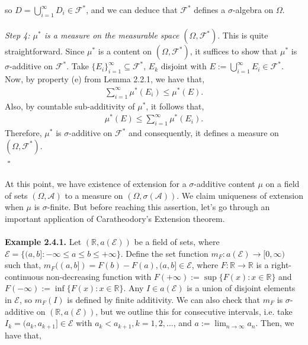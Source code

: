 \documentclass{article}
\begin{document}
so $D = \bigcup_{i=1}^{\infty}D_i \in \mathcal{F}^{*}$, and we can deduce that $\mathcal{F}^{*}$ defines a $\sigma$-algebra on $\Omega$.\\\\
\textit{Step 4: $\mu^{*}$ is a measure on the measurable space $(\Omega, \mathcal{F}^{*})$}. This is quite straightforward. Since $\mu^{*}$ is a content on $(\Omega, \mathcal{F}^{*})$, it suffices to show that $\mu^{*}$ is $\sigma$-additive on $\mathcal{F}^{*}$. Take $\{E_i\}_{i=1}^{\infty} \subseteq \mathcal{F}^{*}$, $E_k$ disjoint with $E := \bigcup_{i=1}^{\infty}E_i \in \mathcal{F}^{*}$. Now, by property (e) from Lemma 2.2.1, we have that,
\begin{eqnarray}
\nonumber
\sum_{i=1}^{\infty}\mu^{*}(E_i) \leq \mu^{*}(E).
\end{eqnarray}
Also, by countable sub-additivity of $\mu^{*}$, it follows that,
\begin{eqnarray}
\nonumber
\mu^{*}(E) \leq \sum_{i=1}^{\infty}\mu^{*}(E_i).
\end{eqnarray}
Therefore, $\mu^{*}$ is $\sigma$-additive on $\mathcal{F}^{*}$ and consequently, it defines a measure on $(\Omega, \mathcal{F}^{*})$. \\ ${}$ \hfill $\square$ \\\\
At this point, we have existence of extension for a $\sigma$-additive content $\mu$ on a field of sets $(\Omega, \mathcal{A})$ to a measure on $(\Omega, \sigma(\mathcal{A}))$. We claim uniqueness of extension when $\mu$ is $\sigma$-finite. But before reaching this assertion, let's go through an important application of Caratheodory's Extension theorem.\\\\
\textbf{Example 2.4.1.} Let $(\mathbb{R}, a(\mathcal{E}))$ be a field of sets, where $\mathcal{E} = \{ (a,b]: -\infty \leq a \leq b \leq +\infty \}$. Define the set function $m_F : a(\mathcal{E}) \to [0,\infty)$ such that, $m_F((a,b]) = F(b) - F(a), (a,b] \in \mathcal{E}$, where $F: \mathbb{R} \to \mathbb{R}$ is a right-continuous non-decreasing function with $F(+\infty) := \sup\{F(x): x \in \mathbb{R}\}$ and $F(-\infty) := \inf\{F(x): x \in \mathbb{R}\}$. Any $I \in a(\mathcal{E})$ is a union of disjoint elements in $\mathcal{E}$, so $m_F(I)$ is defined by finite additivity. We can also check that $m_F$ is $\sigma$-additive on $(\mathbb{R}, a(\mathcal{E}))$, but we outline this for consecutive intervals, i.e. take $I_k = (a_k, a_{k+1}] \in \mathcal{E}$ with $a_k < a_{k+1}, k = 1, 2, ...$, and $a := \lim_{n \to \infty}a_n$. Then, we have that,
\end{document}
